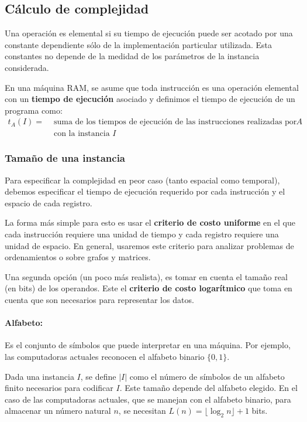 \subsection{Cálculo de complejidad}
Una operación es elemental si su tiempo de ejecución puede ser acotado por una constante dependiente sólo de la implementación particular utilizada. Esta constantes no depende de la medidad de los parámetros de la instancia considerada.

En una máquina RAM, se asume que toda instrucción es una operación elemental con un \textbf{tiempo de ejecución} asociado y definimos el tiempo de ejecución de un programa como:
\begin{align*}
	t_A(I) = &\text{ suma de los tiempos de ejecución de las instrucciones realizadas por el programa } 
	A  \\ &\text{ con la instancia } I
\end{align*}


\subsubsection{Tamaño de una instancia}
Para especificar la complejidad en peor caso (tanto espacial como temporal), debemos especificar el tiempo de ejecución requerido por cada instrucción y el espacio de cada registro.

La forma más simple para esto es usar el \textbf{criterio de costo uniforme} en el que cada instrucción requiere una unidad de tiempo y cada registro requiere una unidad de espacio. En general, usaremos este criterio para analizar problemas de ordenamientos o sobre grafos y matrices.


Una segunda opción (un poco más realista), es tomar en cuenta el tamaño real (en bits) de los operandos. Este el \textbf{criterio de costo logarítmico} que toma en cuenta que son necesarios para representar los datos. 
\paragraph{Alfabeto:} Es el conjunto de símbolos que puede interpretar en una máquina. Por ejemplo, las computadoras actuales reconocen el alfabeto binario \(\{0,1\}\).

\vspace*{5mm}
Dada una instancia \(I\), se define \(|I|\) como el número de símbolos de un alfabeto finito necesarios para codificar \(I\). Este tamaño depende del alfabeto elegido.  En el caso de las computadoras actuales, que se manejan con el alfabeto binario, para almacenar un número natural \(n\), se necesitan \(L(n) = \lfloor\log_2{n}\rfloor + 1\) bits.

